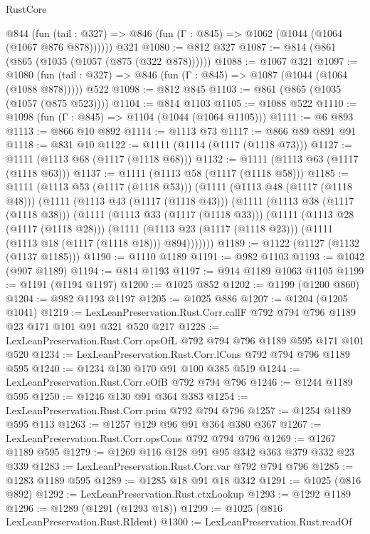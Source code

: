 \begin{lexlean}{RustCore}
\begin{coremodule}
    @844 (fun (tail : @327) => @846 (fun (Γ : @845) => @1062 (@1044 (@1064 (@1067 @876 @878))))))
    @321
@1080 := @812 @327
@1087 := @814 (@861 (@865 (@1035 (@1057 (@875 (@322 @878))))))
@1088 := @1067 @321
@1097 := @1080
    (fun (tail : @327) => @846 (fun (Γ : @845) => @1087 (@1044 (@1064 (@1088 @878)))))
    @522
@1098 := @812 @845
@1103 := @861 (@865 (@1035 (@1057 (@875 @523))))
@1104 := @814 @1103
@1105 := @1088 @522
@1110 := @1098 (fun (Γ : @845) => @1104 (@1044 (@1064 @1105)))
@1111 := @6 @893
@1113 := @866 @10 @892
@1114 := @1113 @73
@1117 := @866 @89 @891 @91
@1118 := @831 @10
@1122 := @1111 (@1114 (@1117 (@1118 @73)))
@1127 := @1111 (@1113 @68 (@1117 (@1118 @68)))
@1132 := @1111 (@1113 @63 (@1117 (@1118 @63)))
@1137 := @1111 (@1113 @58 (@1117 (@1118 @58)))
@1185 := @1111
    (@1113 @53 (@1117 (@1118 @53)))
    (@1111
      (@1113 @48 (@1117 (@1118 @48)))
      (@1111
        (@1113 @43 (@1117 (@1118 @43)))
        (@1111
          (@1113 @38 (@1117 (@1118 @38)))
          (@1111
            (@1113 @33 (@1117 (@1118 @33)))
            (@1111
              (@1113 @28 (@1117 (@1118 @28)))
              (@1111
                (@1113 @23 (@1117 (@1118 @23)))
                (@1111 (@1113 @18 (@1117 (@1118 @18))) @894)))))))
@1189 := @1122 (@1127 (@1132 (@1137 @1185)))
@1190 := @1110 @1189
@1191 := @982 @1103
@1193 := @1042 (@907 @1189)
@1194 := @814 @1193
@1197 := @914 @1189 @1063 @1105
@1199 := @1191 (@1194 @1197)
@1200 := @1025 @852
@1202 := @1199 (@1200 @860)
@1204 := @982 @1193 @1197
@1205 := @1025 @886
@1207 := @1204 (@1205 @1041)
@1219 := LexLeanPreservation.Rust.Corr.callF @792 @794 @796 @1189 @23 @171 @101 @91 @321 @520 @217
@1228 := LexLeanPreservation.Rust.Corr.opsOfL @792 @794 @796 @1189 @595 @171 @101 @520
@1234 := LexLeanPreservation.Rust.Corr.lCons @792 @794 @796 @1189 @595
@1240 := @1234 @130 @170 @91 @100 @385 @519
@1244 := LexLeanPreservation.Rust.Corr.eOfB @792 @794 @796
@1246 := @1244 @1189 @595
@1250 := @1246 @130 @91 @364 @383
@1254 := LexLeanPreservation.Rust.Corr.prim @792 @794 @796
@1257 := @1254 @1189 @595 @113
@1263 := @1257 @129 @96 @91 @364 @380 @367
@1267 := LexLeanPreservation.Rust.Corr.opsCons @792 @794 @796
@1269 := @1267 @1189 @595
@1279 := @1269 @116 @128 @91 @95 @342 @363 @379 @332 @23 @339
@1283 := LexLeanPreservation.Rust.Corr.var @792 @794 @796
@1285 := @1283 @1189 @595
@1289 := @1285 @18 @91 @18 @342
@1291 := @1025 (@816 @892)
@1292 := LexLeanPreservation.Rust.ctxLookup
@1293 := @1292 @1189
@1296 := @1289 (@1291 (@1293 @18))
@1299 := @1025 (@816 LexLeanPreservation.Rust.RIdent)
@1300 := LexLeanPreservation.Rust.readOf

\end{coremodule}
\end{lexlean}
